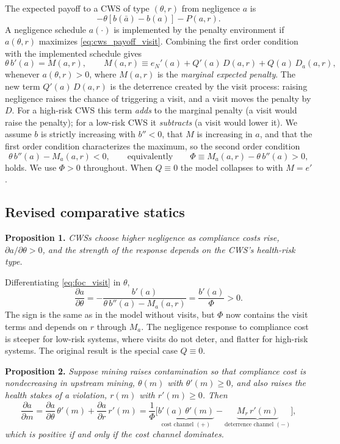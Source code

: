 \documentclass{article}
\begin{document}
The expected payoff to a CWS of type $(\theta,r)$ from negligence $a$ is
\begin{equation}\label{eq:cws_payoff_visit}
-\theta[b(\bar{a})-b(a)] - P(a,r).
\end{equation}
A negligence schedule $a(\cdot)$ is implemented by the penalty environment if $a(\theta,r)$ maximizes \eqref{eq:cws_payoff_visit}. Combining the first order condition with the implemented schedule gives
\begin{equation}\label{eq:foc_visit}
\theta\, b'(a) = M(a,r), \qquad M(a,r) \equiv e_N'(a) + Q'(a)\,D(a,r) + Q(a)\,D_a(a,r),
\end{equation}
whenever $a(\theta,r)>0$, where $M(a,r)$ is the \emph{marginal expected penalty}. The new term $Q'(a)\,D(a,r)$ is the deterrence created by the visit process: raising negligence raises the chance of triggering a visit, and a visit moves the penalty by $D$. For a high-risk CWS this term \emph{adds} to the marginal penalty (a visit would raise the penalty); for a low-risk CWS it \emph{subtracts} (a visit would lower it). We assume $b$ is strictly increasing with $b''<0$, that $M$ is increasing in $a$, and that the first order condition characterizes the maximum, so the second order condition
\[
\theta\, b''(a) - M_a(a,r) < 0, \qquad\text{equivalently}\qquad \Phi \equiv M_a(a,r) - \theta\, b''(a) > 0,
\]
holds. We use $\Phi>0$ throughout. When $Q\equiv 0$ the model collapses to \cite{kang2021understanding} with $M=e'$.

\subsection{Revised comparative statics}

\noindent\textbf{Proposition 1.} \emph{CWSs choose higher negligence as compliance costs rise, $\partial a/\partial\theta > 0$, and the strength of the response depends on the CWS's health-risk type.}

Differentiating \eqref{eq:foc_visit} in $\theta$,
\[
\frac{\partial a}{\partial\theta} = -\frac{b'(a)}{\theta\, b''(a) - M_a(a,r)} = \frac{b'(a)}{\Phi} > 0 .
\]
The sign is the same as in the model without visits, but $\Phi$ now contains the visit terms and depends on $r$ through $M_a$. The negligence response to compliance cost is steeper for low-risk systems, where visits do not deter, and flatter for high-risk systems. The original result is the special case $Q\equiv 0$.

\medskip
\noindent\textbf{Proposition 2.} \emph{Suppose mining raises contamination so that compliance cost is nondecreasing in upstream mining, $\theta(m)$ with $\theta'(m)\ge 0$, and also raises the health stakes of a violation, $r(m)$ with $r'(m)\ge 0$. Then}
\[
\frac{\partial a}{\partial m} = \frac{\partial a}{\partial\theta}\,\theta'(m) + \frac{\partial a}{\partial r}\,r'(m) = \frac{1}{\Phi}\Big[\underbrace{b'(a)\,\theta'(m)}_{\text{cost channel }(+)} - \underbrace{M_r\,r'(m)}_{\text{deterrence channel }(-)}\Big],
\]
\emph{which is positive if and only if the cost channel dominates.}
\end{document}
